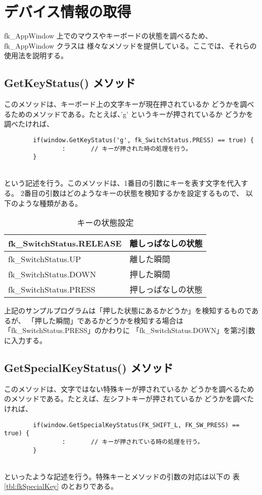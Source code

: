 \section{デバイス情報の取得} \label{sec:device}
fk\_AppWindow 上でのマウスやキーボードの状態を調べるため、fk\_AppWindow クラスは
様々なメソッドを提供している。ここでは、それらの使用法を説明する。
\subsection{GetKeyStatus() メソッド}
このメソッドは、キーボード上の文字キーが現在押されているか
どうかを調べるためのメソッドである。たとえば、'g' というキーが押されているか
どうかを調べたければ、
\\
\begin{screen}
\begin{verbatim}
        if(window.GetKeyStatus('g', fk_SwitchStatus.PRESS) == true) {
                :       // キーが押された時の処理を行う。
        }
\end{verbatim}
\end{screen}
~ \\
という記述を行う。このメソッドは、1番目の引数にキーを表す文字を代入する。
2番目の引数はどのようなキーの状態を検知するかを設定するもので、
以下のような種類がある。

\begin{table}[H]
\caption{キーの状態設定}
\label{tbl:fkSwitchStatus}
\begin{center}
\begin{tabular}{|l|l|}
\hline
fk\_SwitchStatus.RELEASE & 離しっぱなしの状態 \\ \hline
fk\_SwitchStatus.UP & 離した瞬間 \\ \hline
fk\_SwitchStatus.DOWN & 押した瞬間 \\ \hline
fk\_SwitchStatus.PRESS & 押しっぱなしの状態 \\ \hline
\end{tabular}
\end{center}
\end{table}

上記のサンプルプログラムは「押した状態にあるかどうか」を検知するものであるが、
「押した瞬間」であるかどうかを検知する場合は「fk\_SwitchStatus.PRESS」のかわりに
「fk\_SwitchStatus.DOWN」を第2引数に入力する。

\subsection{GetSpecialKeyStatus() メソッド}
このメソッドは、文字ではない特殊キーが押されているか
どうかを調べるためのメソッドである。たとえば、左シフトキーが押されているか
どうかを調べたければ、
\\
\begin{screen}
\begin{verbatim}
        if(window.GetSpecialKeyStatus(FK_SHIFT_L, FK_SW_PRESS) == true) {
                :       // キーが押されている時の処理を行う。
        }
\end{verbatim}
\end{screen}
~ \\
といったような記述を行う。特殊キーとメソッドの引数の対応は以下の
表 \ref{tbl:fkSpecialKey} のとおりである。

